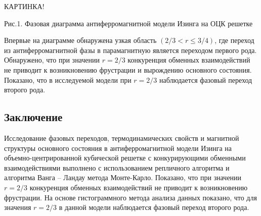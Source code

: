 \begin{LARGE}
КАРТИНКА!
\end{LARGE}

Рис.1. Фазовая диаграмма антиферромагнитной модели Изинга на ОЦК решетке

Впервые на диаграмме обнаружена узкая область $(2/3 < r \leq 3/4)$, где переход из антиферромагнитной фазы в парамагнитную является переходом первого рода. Обнаружено, что при значении $r=2/3$ конкуренция обменных взаимодействий не приводит к возникновению фрустрации и вырождению основного состояния. Показано, что в исследуемой модели при $r = 2/3$ наблюдается фазовый переход второго рода.






\subsection{Заключение}



Исследование фазовых переходов, термодинамических свойств и магнитной структуры основного состояния в антиферромагнитной модели Изинга на объемно-центрированной кубической решетке с конкурирующими обменными взаимодействиями выполнено с использованием репличного алгоритма и алгоритма Ванга -- Ландау метода Монте-Карло. Показано, что при значении $r=2/3$ конкуренция обменных взаимодействий не приводит к возникновению фрустрации. На основе гистограммного метода анализа данных показано, что для значения $r=2/3$ в данной модели наблюдается фазовый переход второго рода.


